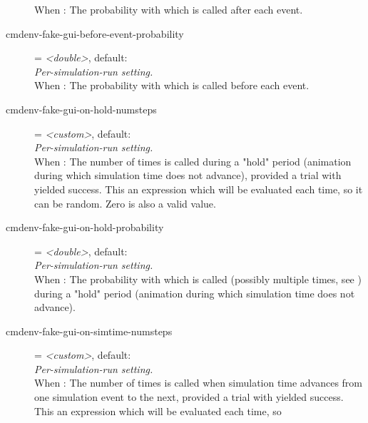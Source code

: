 \begin{description}
    When : The
    probability with which  is called after each event.
\item[cmdenv-fake-gui-before-event-probability] = \textit{<double>}, default: \\
    \textit{Per-simulation-run setting.}\\
    When : The
    probability with which  is called before each
    event.
\item[cmdenv-fake-gui-on-hold-numsteps] = \textit{<custom>}, default: \\
    \textit{Per-simulation-run setting.}\\
    When : The
    number of times  is called during a "hold" period
    (animation during which simulation time does not advance), provided a trial
    with
    yielded success. This an expression which will be evaluated each time, so
    it can be random. Zero is also a valid value.
\item[cmdenv-fake-gui-on-hold-probability] = \textit{<double>}, default: \\
    \textit{Per-simulation-run setting.}\\
    When : The
    probability with which  is called (possibly
    multiple times, see
    )
    during a "hold" period (animation during which simulation time does not
    advance).
\item[cmdenv-fake-gui-on-simtime-numsteps] = \textit{<custom>}, default: \\
    \textit{Per-simulation-run setting.}\\
    When : The
    number of times  is called when simulation time
    advances from one simulation event to the next, provided a trial with
    yielded success. This an expression which will be evaluated each time, so

\end{description}
